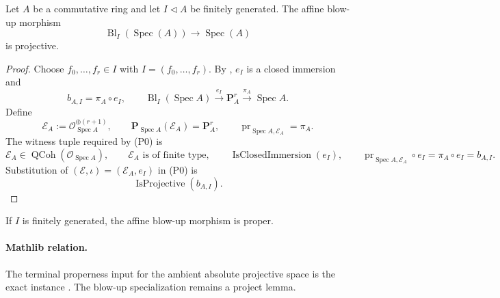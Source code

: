 \begin{proposition}
  \label{prop:nagata-affine-blowup-projective}
  \lean{}

  Let $A$ be a commutative ring and let $I\triangleleft A$ be finitely
  generated.  The affine blow-up morphism
  \[
    \operatorname{Bl}_I(\operatorname{Spec}(A))
      \longrightarrow\operatorname{Spec}(A)
  \]
  is projective.
\end{proposition}

\begin{proof}
  Choose $f_0,\ldots,f_r\in I$ with $I=(f_0,\ldots,f_r)$.  By
  , $e_I$ is a closed
  immersion and
  \[
    b_{A,I}
      =\pi_A\circ e_I,\qquad
    \operatorname{Bl}_I(\operatorname{Spec}A)
      \xrightarrow{e_I}\mathbf P_A^r
      \xrightarrow{\pi_A}\operatorname{Spec}A.
  \]
  Define
  \[
    \mathcal E_A:=\mathcal O_{\operatorname{Spec}A}^{\oplus(r+1)},
    \qquad
    \mathbf P_{\operatorname{Spec}A}(\mathcal E_A)=\mathbf P_A^r,
    \qquad
    \operatorname{pr}_{\operatorname{Spec}A,\mathcal E_A}=\pi_A.
  \]
  The witness tuple required by (P0) is
  \[
    \mathcal E_A\in\operatorname{QCoh}(\mathcal O_{\operatorname{Spec}A}),
    \qquad
    \mathcal E_A\text{ is of finite type},
    \qquad
    \operatorname{IsClosedImmersion}(e_I),
    \qquad
    \operatorname{pr}_{\operatorname{Spec}A,\mathcal E_A}\circ e_I
      =\pi_A\circ e_I=b_{A,I}.
  \]
  Substitution of $(\mathcal E,\iota)=(\mathcal E_A,e_I)$ in (P0) is
  \[
    \operatorname{IsProjective}(b_{A,I}).
  \]
\end{proof}

\begin{lemma}
  \label{lemma:nagata-affine-blowup-proper}
  \lean{}

  If \(I\) is finitely generated, the affine blow-up morphism is proper.

  \paragraph{Mathlib relation.}
  The terminal properness input for the ambient absolute projective space is
  the exact instance
  \texttt{}.
  The blow-up specialization remains a project lemma.
\end{lemma}

